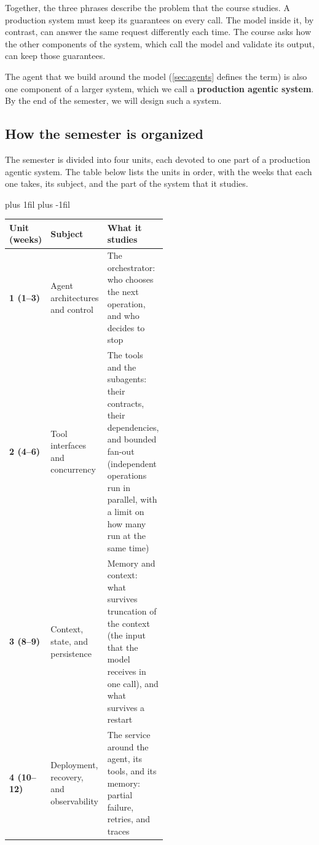 Together, the three phrases describe the problem that the course studies. A production system must
keep its guarantees on every call. The model inside it, by contrast, can answer the same request
differently each time. The course asks how the other components of the system, which call the model
and validate its output, can keep those guarantees.

The agent that we build around the model (\cref{sec:agents} defines the term) is also one component
of a larger system, which we call a \textbf{production agentic system}. By the end of the semester,
we will design such a system.

\subsection*{How the semester is organized}

The semester is divided into four units, each devoted to one part of a production agentic system.
The table below lists the units in order, with the weeks that each one takes, its subject, and the
part of the system that it studies.

\par\vskip 0pt plus 1fil\vskip 0pt plus -1fil\relax
\begin{center}
\begin{adjustbox}{width=\linewidth}\begin{tabularx}{\linewidth}{@{}L{0.17\linewidth}L{0.34\linewidth}X@{}}
  \toprule
  \textbf{Unit (weeks)} & \textbf{Subject} & \textbf{What it studies} \\
  \midrule
  \textbf{1 (1--3)} & Agent architectures and control & The orchestrator: who chooses the next
    operation, and who decides to stop \\
  \addlinespace
  \textbf{2 (4--6)} & Tool interfaces and concurrency & The tools and the subagents: their
    contracts, their dependencies, and bounded fan-out (independent operations run in parallel,
    with a limit on how many run at the same time) \\
  \addlinespace
  \textbf{3 (8--9)} & Context, state, and persistence & Memory and context: what survives
    truncation of the context (the input that the model receives in one call), and what survives a
    restart \\
  \addlinespace
  \textbf{4 (10--12)} & Deployment, recovery, and observability & The service around the agent,
    its tools, and its memory: partial failure, retries, and traces \\
  \bottomrule
\end{tabularx}\end{adjustbox}
\end{center}

